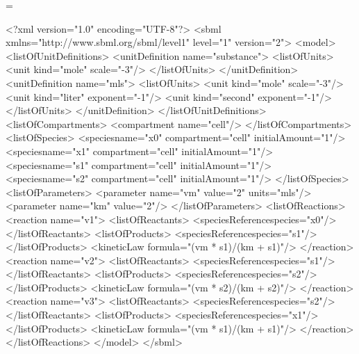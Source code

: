 \documentclass[10pt]{cekarticle}
\makeatletter
\let\realnormalsize=\normalsize
\def\preveqno{}\let\real@float=\@float \let\realend@float=\end@float
\def\@float{\let\@savefreelist\@freelist\real@float}
\def\liih@math{\ifmmode$\else\bad@math\fi}
\def\end@float{\realend@float\global\let\@freelist\@savefreelist}
\def\adjustnormalsize{\def\normalsize{\mathsurround=0pt \realnormalsize
 \parindent=0pt\abovedisplayskip=0pt\belowdisplayskip=0pt}%
 \def\phantompar{\csname par\endcsname}\normalsize}%
\def\lthtmltypeout#1{{\let\protect\string \immediate\write\lthtmlwrite{#1}}}%
\newcommand\lthtmlvboxmathA{\adjustnormalsize\setbox\sizebox=\vbox\bgroup %
 \let\ifinner=\iffalse \let\)\liih@math }%
\newcommand\lthtmlboxmathZ{\@next\next\@currlist{}{\def\next{\voidb@x}}%
 \expandafter\box\next\egroup}%
\newcommand\lthtmlmathtype[1]{\gdef\lthtmlmathenv{#1}}%
\newcommand\lthtmllogmath{\lthtmltypeout{l2hSize %
:\lthtmlmathenv:\the\ht\sizebox::\the\dp\sizebox::\the\wd\sizebox.\preveqno}}%
\newcommand\lthtmlfigureA[1]{\let\@savefreelist\@freelist
       \lthtmlmathtype{#1}\lthtmlvboxmathA}%
\newcommand\lthtmlfigureZ{\lthtmlboxmathZ\lthtmllogmath\copy\sizebox
       \global\let\@freelist\@savefreelist}%
\def\lthtmlcheckvsize{\ifdim\ht\sizebox<\vsize 
  \ifdim\wd\sizebox<\hsize\expandafter\hfill\fi \expandafter\vfill
  \else\expandafter\vss\fi}%
\makeatother
\begin{document}
{\newpage\clearpage
\lthtmlfigureA{example935}%
\begin{example}
<?xml version="1.0" encoding="UTF-8"?>
<sbml xmlns="http://www.sbml.org/sbml/level1" level="1" version="\textcolor{BrickRed}{2}">
    <model>
        <listOfUnitDefinitions>
            <unitDefinition name="substance">
                <listOfUnits>
                    <unit kind="mole" scale="-3"/>
                </listOfUnits>
            </unitDefinition>
            <unitDefinition name="mls">
                <listOfUnits>
                    <unit kind="mole"   scale="-3"/>
                    <unit kind="liter"  exponent="-1"/>
                    <unit kind="second" exponent="-1"/>
                </listOfUnits>
            </unitDefinition>
        </listOfUnitDefinitions>
        <listOfCompartments>
            <compartment name="cell"/>
        </listOfCompartments>
        <listOfSpecies>
            <\textcolor{BrickRed}{species}name="x0" compartment="cell" initialAmount="1"/>
            <\textcolor{BrickRed}{species}name="x1" compartment="cell" initialAmount="1"/>
            <\textcolor{BrickRed}{species}name="s1" compartment="cell" initialAmount="1"/>
            <\textcolor{BrickRed}{species}name="s2" compartment="cell" initialAmount="1"/>
        </listOfSpecies>
        <listOfParameters>
            <parameter name="vm" value="2" units="mls"/>
            <parameter name="km" value="2"/>
        </listOfParameters>
        <listOfReactions>
            <reaction name="v1">
                <listOfReactants>
                    <\textcolor{BrickRed}{speciesReference}\textcolor{BrickRed}{species=}"x0"/>
                </listOfReactants>
                <listOfProducts>
                    <\textcolor{BrickRed}{speciesReference}\textcolor{BrickRed}{species=}"s1"/>
                </listOfProducts>
                <kineticLaw formula="(vm * s1)/(km + s1)"/>
            </reaction>
            <reaction name="v2">
                <listOfReactants>
                    <\textcolor{BrickRed}{speciesReference}\textcolor{BrickRed}{species=}"s1"/>
                </listOfReactants>
                <listOfProducts>
                    <\textcolor{BrickRed}{speciesReference}\textcolor{BrickRed}{species=}"s2"/>
                </listOfProducts>
                <kineticLaw formula="(vm * s2)/(km + s2)"/>
            </reaction>
            <reaction name="v3">
                <listOfReactants>
                    <\textcolor{BrickRed}{speciesReference}\textcolor{BrickRed}{species=}"s2"/>
                </listOfReactants>
                <listOfProducts>
                    <\textcolor{BrickRed}{speciesReference}\textcolor{BrickRed}{species=}"x1"/>
                </listOfProducts>
                <kineticLaw formula="(vm * s1)/(km + s1)"/>
            </reaction>
        </listOfReactions>
    </model>
</sbml>
\end{example}%
\lthtmlfigureZ
\lthtmlcheckvsize\clearpage}
\end{document}
